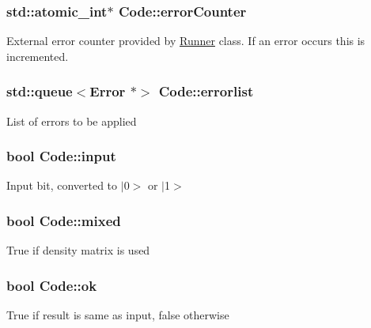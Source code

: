 \subsubsection[{\texorpdfstring{error\+Counter}{errorCounter}}]{\setlength{\rightskip}{0pt plus 5cm}std\+::atomic\+\_\+int$\ast$ Code\+::error\+Counter}\hypertarget{class_code_ab4f00a8ff5a23276a54c7b163b34219a}{}\label{class_code_ab4f00a8ff5a23276a54c7b163b34219a}
External error counter provided by \hyperlink{class_runner}{Runner} class. If an error occurs this is incremented. 
\subsubsection[{\texorpdfstring{errorlist}{errorlist}}]{\setlength{\rightskip}{0pt plus 5cm}std\+::queue$<${\bf Error} $\ast$$>$ Code\+::errorlist\hspace{0.3cm}{\ttfamily [protected]}}\hypertarget{class_code_a8eed999145874a4fe25c8a3ad589d225}{}\label{class_code_a8eed999145874a4fe25c8a3ad589d225}
List of errors to be applied 
\subsubsection[{\texorpdfstring{input}{input}}]{\setlength{\rightskip}{0pt plus 5cm}bool Code\+::input\hspace{0.3cm}{\ttfamily [protected]}}\hypertarget{class_code_a0bdc22fcdc5b2a78a8ace1aea2d96d34}{}\label{class_code_a0bdc22fcdc5b2a78a8ace1aea2d96d34}
Input bit, converted to $\vert$0$>$ or $\vert$1$>$ 
\subsubsection[{\texorpdfstring{mixed}{mixed}}]{\setlength{\rightskip}{0pt plus 5cm}bool Code\+::mixed\hspace{0.3cm}{\ttfamily [protected]}}\hypertarget{class_code_a299e61614fc7ae8e3cbcba232d57d042}{}\label{class_code_a299e61614fc7ae8e3cbcba232d57d042}
True if density matrix is used 
\subsubsection[{\texorpdfstring{ok}{ok}}]{\setlength{\rightskip}{0pt plus 5cm}bool Code\+::ok\hspace{0.3cm}{\ttfamily [protected]}}\hypertarget{class_code_a62ce9f737b915662364116664261969a}{}\label{class_code_a62ce9f737b915662364116664261969a}
True if result is same as input, false otherwise 
